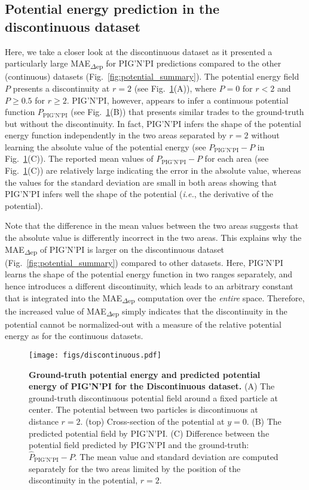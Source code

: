 \documentclass{article}
\newcommand{\pignpi}{PIG'N'PI\xspace}
\begin{document}
\subsection{Potential energy prediction in the discontinuous dataset}
\label{sec:discontinuous_potential_prediction}

Here, we take a closer look at the discontinuous dataset as it presented a particularly large \textsf{MAE\textsubscript{$\Delta$ep}} for \pignpi predictions compared to the other (continuous) datasets (Fig.~\ref{fig:potential_summary}). The potential energy field $P$ presents a discontinuity at $r=2$ (see Fig.~\ref{fig:discontinuous_data}(A)), where $P=0$ for $r<2$ and $P\geq 0.5$ for $r \geq 2$. \pignpi, however, appears to infer a continuous potential function $P_\text{\pignpi}$ (see Fig.~\ref{fig:discontinuous_data}(B)) that presents similar trades to the ground-truth but without the discontinuity. In fact, \pignpi infers the shape of the potential energy function independently in the two areas separated by $r=2$ without learning the absolute value of the potential energy (see $P_\text{\pignpi}-P$ in Fig.~\ref{fig:discontinuous_data}(C)). The reported mean values of $P_\text{\pignpi}-P$ for each area (see Fig.~\ref{fig:discontinuous_data}(C)) are relatively large indicating the error in the absolute value, whereas the values for the standard deviation are small in both areas showing that \pignpi infers well the shape of the potential (\textit{i.e.}, the derivative of the potential). 

Note that the difference in the mean values between the two areas suggests that the absolute value is differently incorrect in the two areas. This explains why the \textsf{MAE\textsubscript{$\Delta$ep}} of \pignpi is larger on the discontinuous dataset (Fig.~\ref{fig:potential_summary}) compared to other datasets. Here, \pignpi learns the shape of the potential energy function in two ranges separately, and hence introduces a different discontinuity, which leads to an arbitrary constant that is integrated into the \textsf{MAE\textsubscript{$\Delta$ep}} computation over the \emph{entire} space. Therefore, the increased value of \textsf{MAE\textsubscript{$\Delta$ep}} simply indicates that the discontinuity in the potential cannot be normalized-out with a measure of the relative potential energy as for the continuous datasets.

\begin{figure}[h]
\centering
\texttt{[image: figs/discontinuous.pdf]}
\caption{\textbf{Ground-truth potential energy and predicted potential energy of \pignpi for the Discontinuous dataset.} (A) The ground-truth discontinuous potential field around a fixed particle  at center. The potential between two particles is discontinuous at distance $r=2$. (top) Cross-section of the potential at $y=0$. (B) The predicted potential field by \pignpi. (C) Difference between the potential field predicted by \pignpi and the ground-truth: $\hat{P}_{\text{\pignpi}}-P$. The mean value and standard deviation are computed separately for the two areas limited by the position of the discontinuity in the potential, $r=2$. }
\label{fig:discontinuous_data}
\end{figure}
\end{document}
